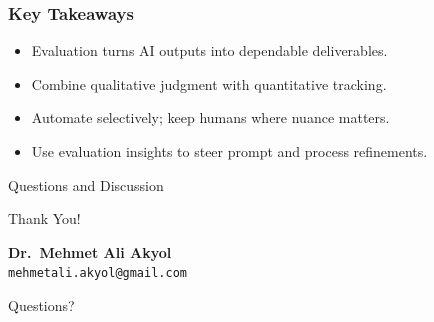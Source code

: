 \documentclass{beamer}
\begin{document}
\begin{frame}
    \frametitle{Key Takeaways}
    \begin{itemize}
        \item Evaluation turns AI outputs into dependable deliverables.
        \item Combine qualitative judgment with quantitative tracking.
        \item Automate selectively; keep humans where nuance matters.
        \item Use evaluation insights to steer prompt and process refinements.
    \end{itemize}
\end{frame}

\begin{frame}{Questions and Discussion}
    \begin{center}
    {\Huge Thank You!}
    \vspace{1cm}

        \textbf{Dr.\ Mehmet Ali Akyol}\\
        \texttt{mehmetali.akyol@gmail.com}
    \vspace{1cm}

    {\large Questions?}
    \end{center}
\end{frame}
\end{document}

